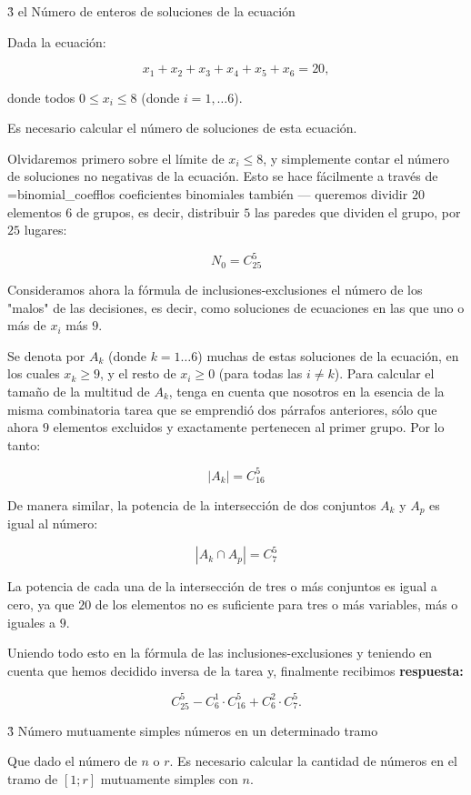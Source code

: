 \h3{ el Número de enteros de soluciones de la ecuación }

Dada la ecuación:

$$ x_1 + x_2 + x_3 + x_4 + x_5 + x_6 = 20, $$

donde todos $0 \le x_i \le 8$ (donde $i = 1, \ldots 6$).

Es necesario calcular el número de soluciones de esta ecuación.

Olvidaremos primero sobre el límite de $x_i \le 8$, y simplemente contar el número de soluciones no negativas de la ecuación. Esto se hace fácilmente a través de \algohref=binomial_coeff{los coeficientes binomiales también} --- queremos dividir $20$ elementos $6$ de grupos, es decir, distribuir $5$ las paredes que dividen el grupo, por $25$ lugares:

$$ N_0 = C_{25}^5 $$

Consideramos ahora la fórmula de inclusiones-exclusiones el número de los "malos" de las decisiones, es decir, como soluciones de ecuaciones en las que uno o más de $x_i$ más $9$.

Se denota por $A_k$ (donde $k = 1 \ldots 6$) muchas de estas soluciones de la ecuación, en los cuales $x_k \ge 9$, y el resto de $x_i \ge 0$ (para todas las $i \ne k$). Para calcular el tamaño de la multitud de $A_k$, tenga en cuenta que nosotros en la esencia de la misma combinatoria tarea que se emprendió dos párrafos anteriores, sólo que ahora $9$ elementos excluidos y exactamente pertenecen al primer grupo. Por lo tanto:

$$ | A_k | = C_{16}^5 $$

De manera similar, la potencia de la intersección de dos conjuntos $A_k$ y $A_p$ es igual al número:

$$ \left| A_k \cap A_p \right| = C_7^5 $$

La potencia de cada una de la intersección de tres o más conjuntos es igual a cero, ya que $20$ de los elementos no es suficiente para tres o más variables, más o iguales a $9$.

Uniendo todo esto en la fórmula de las inclusiones-exclusiones y teniendo en cuenta que hemos decidido inversa de la tarea y, finalmente recibimos \bf{respuesta}:

$$ C_{25}^5 - C_6^1 \cdot C_{16}^5 + C_6^2 \cdot C_7^5. $$


\h3{ Número mutuamente simples números en un determinado tramo }

Que dado el número de $n$ o $r$. Es necesario calcular la cantidad de números en el tramo de $[1; r]$ mutuamente simples con $n$.

